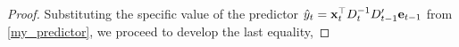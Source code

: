 \begin{proof}
Substituting the specific value of the predictor
$\hat{y}_{t}={\mathbf{x}}^{\top}_{t}D_{t}^{-1}D'_{t-1}\mathbf{e}_{t-1}$
from \eqref{my_predictor}, we proceed to develop
the last equality,

\end{proof}
